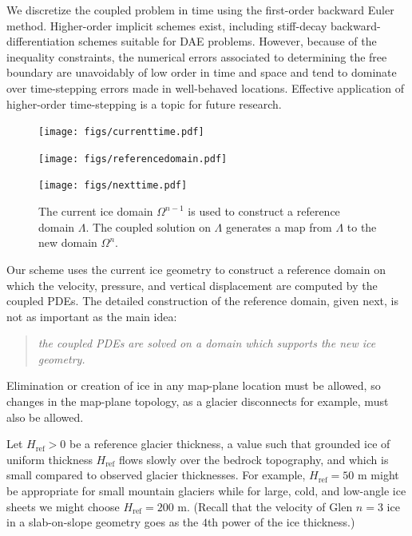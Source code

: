 \documentclass[letterpaper,final,12pt,reqno]{amsart}
\newcommand{\Href}{H_{\text{ref}}}
\begin{document}
We discretize the coupled problem in time using the first-order backward Euler method.  Higher-order implicit schemes exist, including stiff-decay backward-differentiation schemes \cite{AscherPetzold1998,Bueler2021} suitable for DAE problems.  However, because of the inequality constraints, the numerical errors associated to determining the free boundary are unavoidably of low order in time and space \cite{Bueler2020} and tend to dominate over time-stepping errors made in well-behaved locations.  Effective application of higher-order time-stepping is a topic for future research.

\begin{figure}[ht]
\begin{center}
\texttt{[image: figs/currenttime.pdf]}
\vspace{-6mm}

\texttt{[image: figs/referencedomain.pdf]}
\vspace{-1mm}

\texttt{[image: figs/nexttime.pdf]}
\end{center}
\caption{The current ice domain $\Omega^{n-1}$ is used to construct a reference domain $\Lambda$.  The coupled solution on $\Lambda$ generates a map from $\Lambda$ to the new domain $\Omega^n$.}
\label{fig:domainupdate}
\end{figure}

Our scheme uses the current ice geometry to construct a reference domain on which the velocity, pressure, and vertical displacement are computed by the coupled PDEs.  The detailed construction of the reference domain, given next, is not as important as the main idea:
\begin{quote}
\emph{the coupled PDEs are solved on a domain which supports the new ice geometry.}
\end{quote}
Elimination or creation of ice in any map-plane location must be allowed, so changes in the map-plane topology, as a glacier disconnects for example, must also be allowed.

Let $\Href>0$ be a reference glacier thickness, a value such that grounded ice of uniform thickness $\Href$ flows slowly over the bedrock topography, and which is small compared to observed glacier thicknesses.  For example, $\Href=50$ m might be appropriate for small mountain glaciers while for large, cold, and low-angle ice sheets we might choose $\Href=200$ m.  (Recall that the velocity of Glen $n=3$ ice in a slab-on-slope geometry \cite{GreveBlatter2009} goes as the $4$th power of the ice thickness.)
\end{document}
